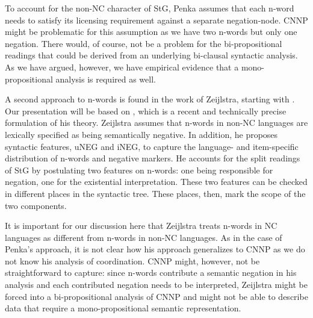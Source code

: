 \documentclass[output=paper]{langsci/langscibook}
\begin{document}
\begin{sloppypar}
  To account for the non-NC character of StG, Penka assumes that each
  n-word needs to satisfy its licensing requirement
  against a separate negation-node.  CNNP might be problematic for
  this assumption as we have two n-words but only one negation.  There
  would, of course, not be a problem for the bi-propositional readings
  that could be derived from an underlying bi-clausal syntactic
  analysis.  As we have argued, however, we have empirical evidence
  that a mono-propositional analysis is required as well.
\end{sloppypar}
\medskip%
A second approach to n-words is found in the work of Zeijlstra, starting with \citet{Zeijlstra:04}. 
Our presentation will be based on \citet{Zeijlstra:15}, which is a recent and technically precise formulation of his theory.
Zeijlstra assumes that n-words in non-NC languages are lexically specified as being semantically negative. In addition, he proposes syntactic features, uNEG and iNEG, to capture the language- and item-specific distribution of n-words and negative markers. 
He accounts for the split readings of StG by postulating
two features on n-words: one being responsible for negation, one for the existential interpretation. These two features can be checked in different places in the syntactic tree. These places, then, mark the scope of the two components.

It is important for our discussion here that Zeijlstra treats n-words in NC languages as different from n-words in non-NC languages. 
As in the case of Penka's approach, it is not clear how his approach generalizes to CNNP as we do not know his analysis of coordination. 
CNNP might, however, not be straightforward to capture: since n-words contribute a semantic negation in his analysis and each contributed negation needs to be interpreted, Zeijlstra might be forced into a bi-propositional analysis of CNNP and might not be able to describe data that require a mono-propositional semantic representation.





\end{document}
